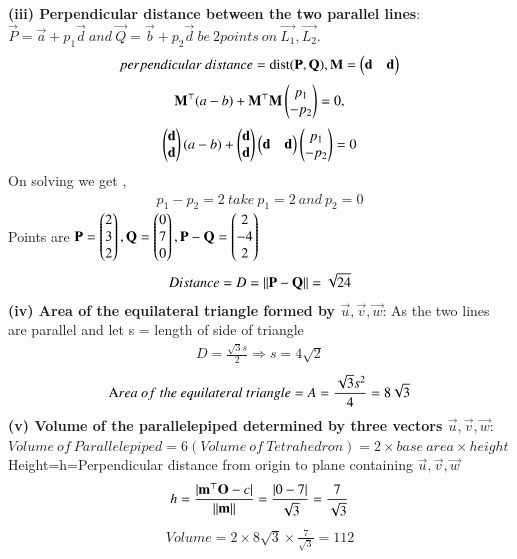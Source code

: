\documentclass[journal]{IEEEtran}
\begin{document}
 \textbf{(iii) Perpendicular distance between the two parallel lines}:
 $\vec{P}=\vec{a}+p_1 \vec{d} \ and\ \vec{Q}=\vec{b}+p_2 \vec{d} \ be \ 2 points\ on\ \vec{L_1},\vec{L_2}. $
\begin{align} 
perpendicular\ distance = \operatorname{dist}(\mathbf{P},\mathbf{Q}) ,\mathbf{M}=\begin{pmatrix}\mathbf{d} & \mathbf{d}\end{pmatrix} 
\end{align}
 \begin{align}
 \mathbf{M}^\top(a-b) + \mathbf{M}^\top\mathbf{M}\begin{pmatrix}p_1\\-p_2\end{pmatrix} = 0 , 
 \end{align}
 \begin{align}
 \begin{pmatrix}\mathbf{d}\\\mathbf{d}\end{pmatrix}(a-b) + \begin{pmatrix}\mathbf{d}\\\mathbf{d}\end{pmatrix}\begin{pmatrix}\mathbf{d} & \mathbf{d}\end{pmatrix}\begin{pmatrix}p_1\\-p_2\end{pmatrix} = 0
 \end{align}
On solving we get , 
\begin{align}
p_1 - p_2 = 2 \ take \ p_1=2 \ and \ p_2=0
\end{align}
 Points are $\mathbf{P}=\begin{pmatrix}2\\3\\2\end{pmatrix} , \mathbf{Q}=\begin{pmatrix}0\\7\\0\end{pmatrix},\mathbf{P}-\mathbf{Q}=\begin{pmatrix}2\\-4\\2\end{pmatrix}$
 \begin{align}
Distance = D= {\left\lVert\mathbf{P}-\mathbf{Q}\right\rVert} = \sqrt{24} 
\end{align}
\textbf{(iv) Area of the equilateral triangle formed by $\vec{u},\vec{v},\vec{w}$}:
As the two lines are parallel and let s = length of side of triangle
\begin{align}
D = \frac{\sqrt{3}s}{2} \Longrightarrow s = 4\sqrt{2}
\end{align}
\begin{align}
\text Area \ of\ the\ equilateral\ triangle = A = \frac{\sqrt{3}s^2}{4} = 8\sqrt{3} 
\end{align}
\textbf{(v) Volume of the parallelepiped determined by three vectors $\vec{u},\vec{v},\vec{w}$}:
$Volume\ of\ Parallelepiped = 6(Volume\ of\ Tetrahedron) = 2\times base\ area\times height$
Height=h=Perpendicular distance from origin to plane containing $\vec{u},\vec{v},\vec{w}$  
\begin{align}
h=\frac{|\mathbf{m}^\top\mathbf{O}-c|}{\left\lVert\mathbf{m}\right\rVert}=\frac{|0-7|}{\sqrt{3}}=\frac{7}{\sqrt{3}}
\end{align}
\begin{align}
Volume = 2\times8\sqrt{3}\times\frac{7}{\sqrt{3}} = 112
\end{align}
\end{document}
